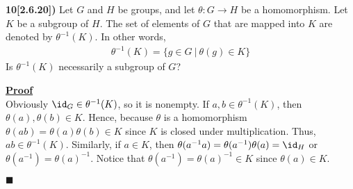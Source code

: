 \documentclass[12pt,a4paper]{article}
\newcommand{\prob}[2]{\textbf{#1)} #2}
\newenvironment{proof}
{
\textbf{\underline{Proof}} \\
}
{
\begin{flushright}
$\blacksquare$
\end{flushright}}
\begin{document}
\prob{10[2.6.20]}{Let $G$ and $H$ be groups, and let $\theta: G \rightarrow H$ be a homomorphism. Let $K$ be a subgroup of $H$. The set of elements of $G$ that are mapped into $K$ are denoted by $\theta^{-1}(K)$. In other words,
\begin{align*}
\theta^{-1}(K) = \{g \in G ~|~ \theta(g) \in K \}
\end{align*}
Is $\theta^{-1}(K)$ necessarily a subgroup of $G$?}

\begin{proof}
Obviously $\id_G \in \theta^{-1}(K)$, so it is nonempty. If $a,b \in \theta^{-1}(K)$, then $\theta(a),\theta(b) \in K$. Hence, because $\theta$ is a homomorphism $\theta(ab) = \theta(a)\theta(b) \in K$ since $K$ is closed under multiplication. Thus, $ab \in \theta^{-1}(K)$. Similarly, if $a \in K$, then $\theta(a^{-1}a) = \theta(a^{-1})\theta(a) = \id_H$ or $\theta(a^{-1}) = \theta(a)^{-1}$. Notice that $\theta(a^{-1}) = \theta(a)^{-1} \in K$ since $\theta(a) \in K$.
\end{proof}
\end{document}
